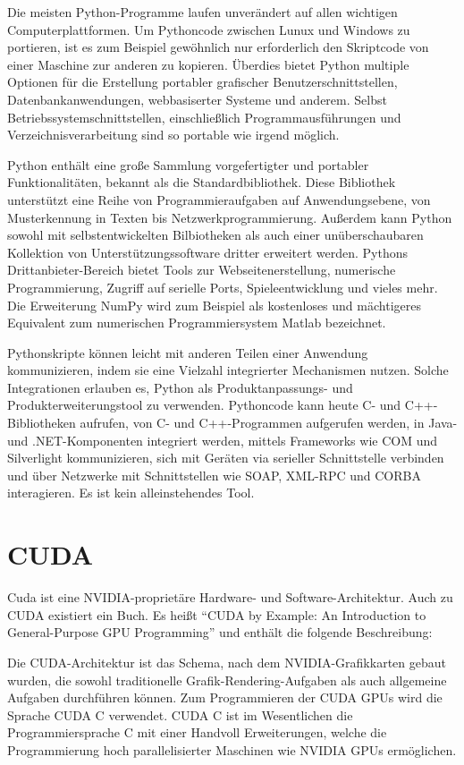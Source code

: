 Die meisten Python-Programme laufen unverändert auf allen wichtigen Computerplattformen. Um Pythoncode zwischen Lunux und Windows zu portieren, ist es zum Beispiel gewöhnlich nur erforderlich den Skriptcode von einer Maschine zur anderen zu kopieren. Überdies bietet Python multiple Optionen für die Erstellung portabler grafischer Benutzerschnittstellen, Datenbankanwendungen, webbasiserter Systeme und anderem. Selbst Betriebssystemschnittstellen, einschließlich Programmausführungen und Verzeichnisverarbeitung sind so portable wie irgend möglich.

Python enthält eine große Sammlung vorgefertigter und portabler Funktionalitäten, bekannt als die Standardbibliothek. Diese Bibliothek unterstützt eine Reihe von Programmieraufgaben auf Anwendungsebene, von Musterkennung in Texten bis Netzwerkprogrammierung. Außerdem kann Python sowohl mit selbstentwickelten Bilbiotheken als auch einer unüberschaubaren Kollektion von Unterstützungssoftware dritter erweitert werden. Pythons Drittanbieter-Bereich bietet Tools zur Webseitenerstellung, numerische Programmierung, Zugriff auf serielle Ports, Spieleentwicklung und vieles mehr. Die Erweiterung NumPy wird zum Beispiel als kostenloses und mächtigeres Equivalent zum numerischen Programmiersystem Matlab bezeichnet.

Pythonskripte können leicht mit anderen Teilen einer Anwendung kommunizieren, indem sie eine Vielzahl integrierter Mechanismen nutzen. Solche Integrationen erlauben es, Python als Produktanpassungs- und Produkterweiterungstool zu verwenden. Pythoncode kann heute C- und C++-Bibliotheken aufrufen, von C- und C++-Programmen aufgerufen werden, in Java- und .NET-Komponenten integriert werden, mittels Frameworks wie COM und Silverlight kommunizieren, sich mit Geräten via serieller Schnittstelle verbinden und über Netzwerke mit Schnittstellen wie SOAP, XML-RPC und CORBA interagieren. Es ist kein alleinstehendes Tool. \cite{lutz2013python}

\section{CUDA}
\label{sec:cuda}
Cuda ist eine NVIDIA-proprietäre Hardware- und Software-Architektur. Auch zu CUDA existiert ein Buch. Es heißt ``CUDA by Example: An Introduction to General-Purpose GPU Programming'' \cite{sanders2010cuda} und enthält die folgende Beschreibung:

Die CUDA-Architektur ist das Schema, nach dem NVIDIA-Grafikkarten gebaut wurden, die sowohl traditionelle Grafik-Rendering-Aufgaben als auch allgemeine Aufgaben durchführen können. Zum Programmieren der CUDA GPUs wird die Sprache CUDA C verwendet. CUDA C ist im Wesentlichen die Programmiersprache C mit einer Handvoll Erweiterungen, welche die Programmierung hoch parallelisierter Maschinen wie NVIDIA GPUs ermöglichen.

